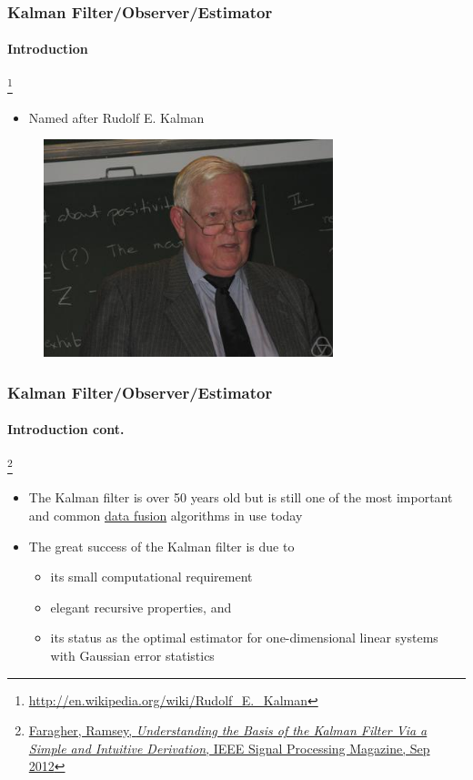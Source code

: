 \documentclass{beamer}
\begin{document}
\begin{frame}
\frametitle{Kalman Filter/Observer/Estimator}
\framesubtitle{Introduction}

\footnote{\tiny\hspace{-0.23in} \href{http://en.wikipedia.org/wiki/Rudolf_E._Kalman}{http://en.wikipedia.org/wiki/Rudolf\_E.\_Kalman}}
\scriptsize
\begin{itemize}
\item Named after Rudolf E. Kalman
\end{itemize}
\begin{figure}[h]
\centering
\includegraphics[width=0.75\textwidth]{figs/CONTROLS_portrait_RudolfKalman.jpg}
\end{figure}
\end{frame}



\begin{frame}
\frametitle{Kalman Filter/Observer/Estimator}
\framesubtitle{Introduction \tiny cont.}

\footnote{\tiny\hspace{-0.23in} \href{http://www.cl.cam.ac.uk/~rmf25/papers/Understanding the Basis of the Kalman Filter.pdf}{Faragher, Ramsey, \emph{Understanding the Basis of the Kalman Filter Via a Simple and Intuitive Derivation}, IEEE Signal Processing Magazine, Sep 2012}}
\scriptsize
\begin{itemize}
\item The Kalman filter is over 50 years old but is still one of the most important and common \underline{data fusion} algorithms in use today
\item The great success of the Kalman filter is due to 
\begin{itemize}\scriptsize
\item its small computational requirement
\item elegant recursive properties, and 
\item its status as the optimal estimator for one-dimensional linear systems with Gaussian error statistics
\end{itemize}
\end{itemize}
\end{frame}
\end{document}
